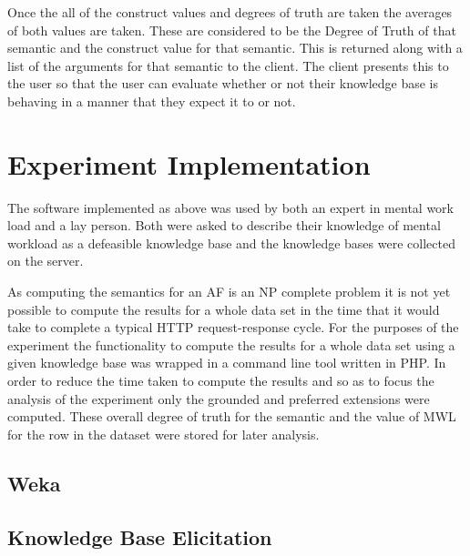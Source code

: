 Once the all of the construct values and degrees of truth are taken the averages of both values are taken. These are considered to be the Degree of Truth of that semantic and the construct value for that semantic. This is returned along with a list of the arguments for that semantic to the client. The client presents this to the user so that the user can evaluate whether or not their knowledge base is behaving in a manner that they expect it to or not.


\section{Experiment Implementation}

The software implemented as above was used by both an expert in mental work load and a lay person. Both were asked to describe their knowledge of mental workload as a defeasible knowledge base and the knowledge bases were collected on the server.

As computing the semantics for an AF is an NP complete problem it is not yet possible to compute the results for a whole data set in the time that it would take to complete a typical HTTP request-response cycle. For the purposes of the experiment the functionality to compute the results for a whole data set using a given knowledge base was wrapped in a command line tool written in PHP. In order to reduce the time taken to compute the results and so as to focus the analysis of the experiment only the grounded and preferred extensions were computed. These overall degree of truth for the semantic and the value of MWL for the row in the dataset were stored for later analysis.

\subsection{Weka}




\subsection{Knowledge Base Elicitation}

